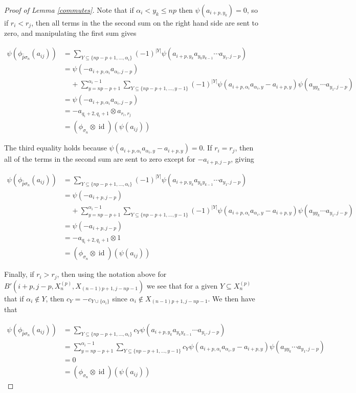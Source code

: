 \documentclass[11pt]{amsart}
\def\s{{\sigma}}
\def\a{\alpha}
\def\fp{{\scriptstyle \bar{\bar{p}}}}
\newcommand\id{\operatorname{id}}
\theoremstyle{definition}
\begin{document}
\begin{proof} [Proof of Lemma \ref{commutes}]
Note that if $\a_i < y_k \le np$ then $\psi(a_{i+p,y_k}) = 0$, so if $r_i < r_j$, then all terms in the the second sum on the right hand side are sent to zero, and manipulating the first sum gives

\begin{align*}
\psi\left(\phi_{\fp \s_n}(a_{ij})\right) &= \sum_{Y\subseteq \{np-p+1,\ldots,\a_i\}}(-1)^{|Y|}\psi(a_{i+p,y_k}a_{y_ky_{k-1}}\cdots a_{y_1,j-p})\\
&= \psi\left(- a_{i+p,\a_i}a_{\a_i,j-p}\right)\\
& \;\;\;\;+ \sum_{y=np-p+1}^{\a_i-1}\sum_{Y\subseteq \{np-p+1,\ldots,y-1\}}(-1)^{|Y|}\psi\left(a_{i+p,\a_i}a_{\a_i,y} - a_{i+p,y}\right)\psi\left(a_{yy_k}\cdots a_{y_1,j-p}\right)\\
&= \psi\left(- a_{i+p,\a_i}a_{\a_i,j-p}\right)\\
&= - a_{q_i + 2,q_i + 1}\otimes a_{r_i,r_j}\\
&= (\phi_{\s_n} \otimes \id)(\psi(a_{ij}))
\end{align*}

The third equality holds because $\psi\left(a_{i+p,\a_i}a_{\a_i,y} - a_{i+p,y}\right) = 0$.  If $r_i = r_j$, then all of the terms in the second sum are sent to zero except for $-a_{i+p,j-p}$, giving

\begin{align*}
\psi\left(\phi_{\fp \s_n}(a_{ij})\right) &= \sum_{Y\subseteq \{np-p+1,\ldots,\a_i\}}(-1)^{|Y|}\psi(a_{i+p,y_k}a_{y_ky_{k-1}}\cdots a_{y_1,j-p})\\
&= \psi\left(- a_{i+p,j-p}\right)\\
& \;\;\;\;+ \sum_{y=np-p+1}^{\a_i-1}\sum_{Y\subseteq \{np-p+1,\ldots,y-1\}}(-1)^{|Y|}\psi\left(a_{i+p,\a_i}a_{\a_i,y} - a_{i+p,y}\right)\psi\left(a_{yy_k}\cdots a_{y_1,j-p}\right)\\
&= \psi\left(- a_{i+p,j-p}\right)\\
&= - a_{q_i + 2,q_i + 1}\otimes 1\\
&= (\phi_{\s_n} \otimes \id)(\psi(a_{ij}))
\end{align*}

Finally, if $r_i > r_j$, then using the notation above for $B'(i+p,j-p,X_n^{(p)},X_{(n-1)p+1,j-np-1})$ we see that for a given $Y\subseteq X_n^{(p)}$ that if $\a_i\not\in Y$, then $c_Y = -c_{Y\cup \{\a_i\}}$ since $\a_i\not\in X_{(n-1)p+1,j-np-1}$.  We then have that

\begin{align*}
\psi\left(\phi_{\fp \s_n}(a_{ij})\right) &= \sum_{Y\subseteq \{np-p+1,\ldots,\a_i\}}c_Y\psi(a_{i+p,y_k}a_{y_ky_{k-1}}\cdots a_{y_1,j-p})\\
&= \sum_{y=np-p+1}^{\a_i-1}\sum_{Y\subseteq \{np-p+1,\ldots,y-1\}}c_Y\psi\left(a_{i+p,\a_i}a_{\a_i,y} - a_{i+p,y}\right)\psi\left(a_{yy_k}\cdots a_{y_1,j-p}\right)\\
&= 0\\
&= (\phi_{\s_n} \otimes \id)(\psi(a_{ij}))
\end{align*}

\end{proof}
\end{document}
